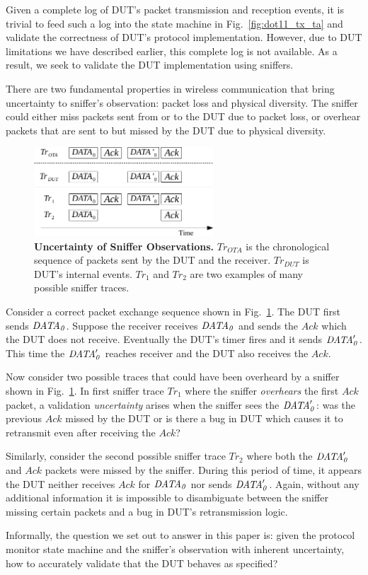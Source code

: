 Given a complete log of DUT's packet transmission and reception events, it is
trivial to feed such a log into the state machine in Fig.~\ref{fig:dot11_tx_ta}
and validate the correctness of DUT's protocol implementation. However, due to
DUT limitations we have described earlier, this complete log is not
available. As a result, we seek to validate the DUT implementation using
sniffers.

There are two fundamental properties in wireless communication that bring uncertainty to
sniffer's observation: packet loss and physical diversity. The sniffer could
either miss packets sent from or to the DUT due to packet loss, or overhear packets
that are sent to but missed by the DUT due to physical diversity.

\begin{figure}[t!]
  \centering
  \includegraphics[width=0.6\textwidth]{./figures/false_pos.pdf}
  \caption{\textbf{Uncertainty of Sniffer Observations.} $Tr_{OTA}$ is
    the chronological sequence of packets sent by the DUT and the receiver.
    $Tr_{DUT}$ is DUT's internal events. $Tr_1$ and $Tr_2$ are two examples of
    many possible sniffer traces.}
  \label{fig:sniffer_in_middle}
\end{figure}

Consider a correct packet exchange sequence shown in
Fig.~\ref{fig:sniffer_in_middle}. The DUT first sends $\it{DATA}_0$.  Suppose the
receiver receives $\it{DATA}_0$ and sends the $Ack$ which the DUT does not receive.
Eventually the DUT's timer fires and it sends $\it{DATA}'_0$.  This time the
$\it{DATA}'_0$ reaches receiver and the DUT also receives the $Ack$.

Now consider two possible traces that could have been overheard by a sniffer shown
in Fig.~\ref{fig:sniffer_in_middle}.
In first sniffer trace $Tr_1$ where the sniffer
\textit{overhears} the first $Ack$ packet, a validation \textit{uncertainty}
arises when the sniffer sees the $\it{DATA}'_0$: was the previous $Ack$ missed by the
DUT or is there a bug in DUT which causes it to retransmit even after receiving
the $Ack$?

Similarly, consider the second possible sniffer trace $Tr_2$
where both the $\it{DATA}'_0$ and $Ack$ packets were missed by the sniffer. During
this period of time, it appears the DUT neither receives $Ack$ for $\it{DATA}_0$ nor
sends $\it{DATA}'_0$. Again, without any additional information it is impossible to
disambiguate between the sniffer missing certain packets and a bug in DUT's
retransmission logic.

Informally, the question we set out to answer in this paper is: given the
protocol monitor state machine and the sniffer's observation with inherent
uncertainty, how to accurately validate that the DUT behaves as specified?
